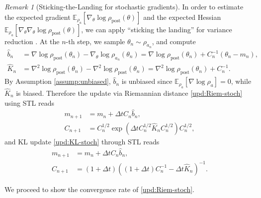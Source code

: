 \documentclass[11pt]{article}
\theoremstyle{plain}
\theoremstyle{definition}
\theoremstyle{remark}
\newtheorem{remark}[theorem]{Remark}
\newcommand{\E}{\mathbb{E}}
\newcommand{\post}{\mathrm{post}}
\begin{document}
\begin{remark}[Sticking-the-Landing for stochastic gradients]
\label{rmk:STL}
    In order to estimate the expected gradient $\E_{\rho_a} [\nabla_\theta \log \rho_\post(\theta)]$ and the expected Hessian $\E_{\rho_a} [\nabla_\theta \nabla_\theta \log \rho_\post (\theta)]$, we can apply ``sticking the landing'' for variance reduction \cite{roeder2017sticking}. At the $n$-th step, we sample $\theta_n \sim \rho_{a_n}$, and compute 
    \begin{align*}
        \hat b_n &= \nabla \log \rho_\post (\theta_n) - \nabla_\theta \log \rho_{a_n} (\theta_n) = \nabla \log \rho_\post (\theta_n) + C_n^{-1} (\theta_n - m_n), \\
        \widehat{K}_n &= \nabla^2 \log \rho_\post (\theta_n) - \nabla^2 \log \rho_\post (\theta_n) = \nabla^2 \log \rho_\post (\theta_n) + C_n^{-1}.
    \end{align*}
    By Assumption \ref{assump:unbiased}, $\hat b_n$ is unbiased since $\E_{\rho_a}[\nabla \log \rho_a] = 0$, while $\widehat K_n$ is biased. Therefore the update via Riemannian distance \eqref{upd:Riem-stoch} using STL reads
    \begin{equation}\label{upd:Riem-STL}
        \begin{aligned}
            m_{n+1} &= m_n + \Delta t C_n \hat b_n, \\
            C_{n+1} &= C_n^{1/2} \exp \left( \Delta t C_n^{1/2} \widehat K_n C_n^{1/2} \right) C_n^{1/2},
        \end{aligned}
    \end{equation}
    and KL update \eqref{upd:KL-stoch} through STL reads
    \begin{equation}\label{upd:KL-STL}
        \begin{aligned}
            m_{n+1} &= m_n + \Delta t C_n \hat b_n, \\
            C_{n+1} &= (1 + \Delta t) \left( (1 + \Delta t) C_n^{-1} - \Delta t \widehat K_n \right)^{-1}.
        \end{aligned}
    \end{equation}
\end{remark}

We proceed to show the convergence rate of \eqref{upd:Riem-stoch}.
\end{document}
